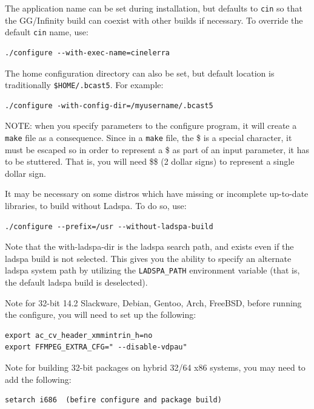 The application name can be set during installation, but defaults to
\texttt{cin} so that the GG/Infinity build can coexist with other
\CGG{} builds if necessary.  To override the default \texttt{cin}
name, use:
\begin{lstlisting}[style=sh]
./configure --with-exec-name=cinelerra
\end{lstlisting}

The home configuration directory can also be set, but default
location is traditionally \texttt{\$HOME/.bcast5}.  For example:

\begin{lstlisting}[style=sh]
./configure -with-config-dir=/myusername/.bcast5
\end{lstlisting}

NOTE: when you specify parameters to the configure program, it will
create a \texttt{make} file as a consequence.  Since in a
\texttt{make} file, the \$ is a special character, it must be
escaped so in order to represent a \$ as part of an input parameter,
it has to be stuttered.  That is, you will need \$\$ (2 dollar
signs) to represent a single dollar sign.

It may be necessary on some distros which have missing or incomplete
up-to-date libraries, to build \CGG{} without Ladspa.  To do so,
use:

\begin{lstlisting}[style=sh]
./configure --prefix=/usr --without-ladspa-build
\end{lstlisting}

Note that the with-ladspa-dir is the ladspa search path, and
exists even if the ladspa build is not selected.  This gives you
the ability to specify an alternate ladspa system path by
utilizing the \texttt{LADSPA\_PATH} environment variable (that is,
the default ladspa build is deselected).

Note for 32-bit 14.2 Slackware, Debian, Gentoo, Arch, FreeBSD,
before running the configure, you will need to set up the following:

\begin{lstlisting}[style=sh]
export ac_cv_header_xmmintrin_h=no
export FFMPEG_EXTRA_CFG=" --disable-vdpau"
\end{lstlisting}

Note for building 32-bit packages on hybrid 32/64 x86 systems, you may
need to add the following:

\begin{lstlisting}[style=sh]
setarch i686  (befire configure and package build)
\end{lstlisting}

